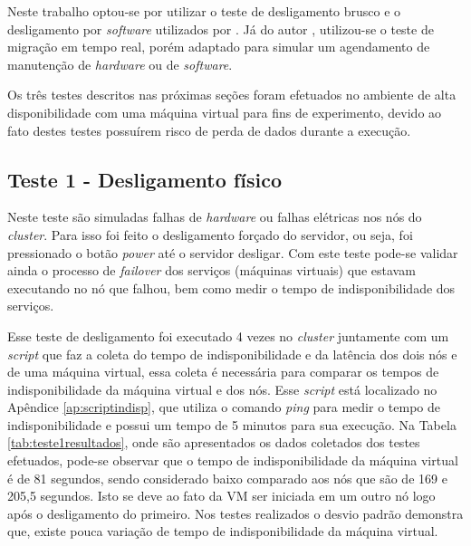 Neste trabalho optou-se por utilizar o teste de desligamento brusco e o desligamento por \textit{software} utilizados por \citet{reis2009}.
Já do autor \citet{goncalves2009}, utilizou-se o teste de migração em tempo real, porém adaptado para simular um agendamento de manutenção de 
\textit{hardware} ou de \textit{software}.

Os três testes descritos nas próximas seções foram efetuados no ambiente de alta disponibilidade com uma máquina virtual para fins de experimento, 
devido ao fato destes testes possuírem risco de perda de dados durante a execução.

\subsection{Teste 1 - Desligamento físico}

Neste teste são simuladas falhas de \textit{hardware} ou falhas elétricas nos nós do \textit{cluster}. Para isso foi feito o desligamento 
forçado do servidor, ou seja, foi pressionado o botão \textit{power} até o servidor desligar.
Com este teste pode-se validar ainda o processo de \textit{failover} dos serviços (máquinas virtuais) que estavam executando no nó que falhou, 
bem como medir o tempo de indisponibilidade dos serviços. 

Esse teste de desligamento foi executado 4 vezes no \textit{cluster} juntamente com um \textit{script} que faz a coleta do tempo de
indisponibilidade e da latência dos dois nós e de uma máquina virtual, essa coleta é necessária para comparar os tempos de indisponibilidade da
máquina virtual e dos nós. 
Esse \textit{script} está localizado no Apêndice \ref{ap:scriptindisp}, que utiliza o comando \textit{ping} para medir o tempo de 
indisponibilidade e possui um tempo de 5 minutos para sua execução. Na Tabela \ref{tab:teste1resultados}, onde são apresentados os dados coletados 
dos testes efetuados, pode-se observar que o tempo de indisponibilidade da máquina virtual é de 81 segundos, sendo considerado baixo comparado 
aos nós que são de 169 e 205,5 segundos. Isto se deve ao fato da \ac{VM} ser iniciada em um outro nó logo após o desligamento do primeiro. 
Nos testes realizados o desvio padrão demonstra que, existe pouca variação de tempo de indisponibilidade da máquina virtual.

